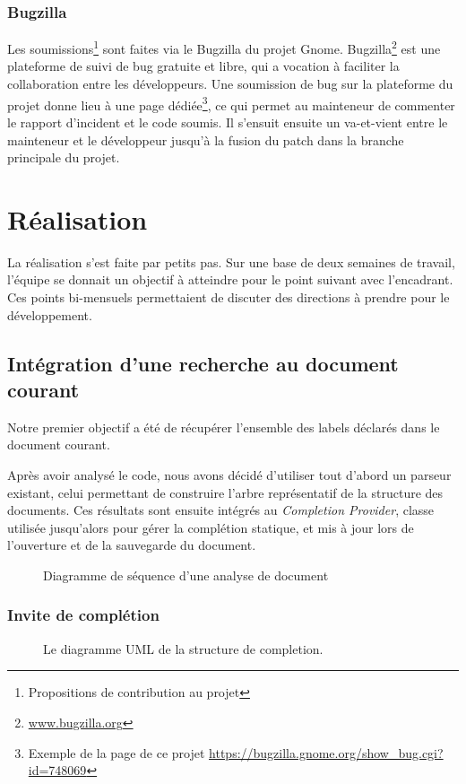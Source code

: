 \documentclass[a4paper,11pt]{report}
\begin{document}
\subsection{Bugzilla}
Les soumissions\footnote{Propositions de contribution au projet} sont faites via le Bugzilla du projet Gnome.
Bugzilla\footnote{\url{www.bugzilla.org}} est une plateforme de suivi de bug gratuite et libre, qui a vocation à faciliter la collaboration entre les développeurs.
Une soumission de bug sur la plateforme du projet donne lieu à une page dédiée\footnote{Exemple de la page de ce projet \url{https://bugzilla.gnome.org/show_bug.cgi?id=748069}}, ce qui permet au mainteneur de commenter le rapport d'incident et le code soumis.
Il s'ensuit ensuite un va-et-vient entre le mainteneur et le développeur jusqu'à la fusion du patch dans la branche principale du projet.

\chapter*{Réalisation}
La réalisation s'est faite par petits pas. Sur une base de deux semaines de travail, l'équipe se donnait un objectif à atteindre pour le point suivant avec l'encadrant.
Ces points bi-mensuels permettaient de discuter des directions à prendre pour le développement.

\section{Intégration d'une recherche au document courant}
Notre premier objectif a été de récupérer l'ensemble des labels déclarés dans le document courant.

Après avoir analysé le code, nous avons décidé d'utiliser tout d'abord un parseur existant, celui permettant de construire l'arbre représentatif de la structure des documents.
Ces résultats sont ensuite intégrés au \textit{Completion Provider}, classe utilisée jusqu'alors pour gérer la complétion statique, et mis à jour lors de l'ouverture et de la sauvegarde du document.

\begin{figure}[h]
\label{fig:doc_opening}
\centering

\caption{Diagramme de séquence d'une analyse de document}
\end{figure}

\subsection{Invite de complétion}
\begin{figure}[h!]
\label{fig:uml_completion_structure}
\centering

\caption{Le diagramme UML de la structure de completion.}
\end{figure}
\end{document}
